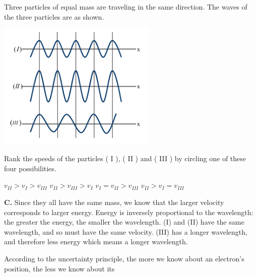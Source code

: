 \documentclass[12pt]{exam}
\begin{document}
\begin{questions}
	\question Three particles of equal mass are traveling in the same direction. The waves of
the three particles are as shown.
	\begin{center}
		\includegraphics[width=3in]{../images/deBroglie.png}
	\end{center}
	Rank the speeds of the particles ( I ), ( II ) and ( III ) by circling one of these four possibilities.
\begin{choices}
	\choice $v_{II} > v_I > v_{III}$
	\choice $v_{II} > v_{III} > v_I$
	\choice $v_{I} = v_{II} > v_{III}$
	\choice $v_{II} > v_I = v_{III}$
\end{choices}
\begin{TheSolution}
\textbf{C.} Since they all have the same mass, we know that the larger velocity corresponds to larger energy. Energy is inversely proportional to the wavelength: the greater the energy, the smaller the wavelength. (I) and (II) have the same wavelength, and so must have the same velocity. (III) has a longer wavelength, and therefore less energy which means a longer wavelength.
\end{TheSolution}

	\question According to the uncertainty principle, the more we know about an electron's position,
the less we know about its


\end{questions}
\end{document}
